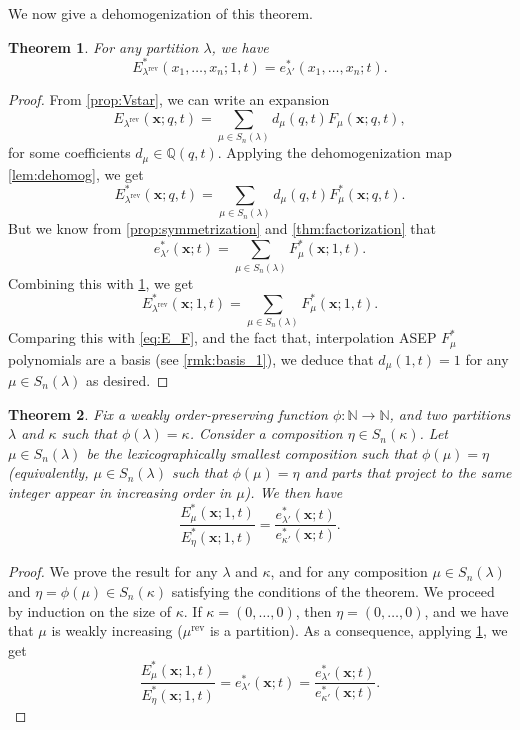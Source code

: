 \documentclass[12pt]{amsart}
\newtheorem{thm}{Theorem}[section]
\theoremstyle{definition}
\newcommand{\bfx}{\boldsymbol{x}}
\DeclareMathOperator{\rev}{rev}
\newcommand{\QQ}{\mathbb Q}
\newcommand{\NN}{\mathbb N}
\begin{document}
\begin{appendices}
We now give  a dehomogenization of this theorem.

\begin{thm}\label{thm:E_partition}
    For any partition $\lambda$, we have
    $$E^*_{\lambda^{\rev}}(x_1,\dots,x_n;1,t)=e^*_{\lambda'}(x_1,\dots,x_n;t).$$
\end{thm}
\begin{proof}
From \cref{prop:Vstar}, we can write an expansion
$$E_{\lambda^{\rev}}(\bfx;q,t)=\sum_{\mu\in S_n(\lambda)}d_{\mu}(q,t)F_\mu(\bfx;q,t),$$
for some coefficients $d_\mu\in \QQ(q,t)$.
Applying the dehomogenization map \cref{lem:dehomog}, we get
\begin{equation}\label{eq:E_F}
  E^*_{\lambda^{\rev}}(\bfx;q,t)=\sum_{\mu\in S_n(\lambda)}d_{\mu}(q,t)F^*_\mu(\bfx;q,t).  
\end{equation}
    But we know from \cref{prop:symmetrization} and \cref{thm:factorization} that
    $$e^*_{\lambda'}(\bfx;t)=\sum_{\mu\in S_n(\lambda)}F^*_\mu(\bfx;1,t).$$
    Combining this with  \cref{thm:E_partition},       we get
    $$E^*_{\lambda^{\rev}}(\bfx;1,t)=\sum_{\mu\in S_n(\lambda)}F^*_\mu(\bfx;1,t).$$
    Comparing this with \cref{eq:E_F}, and the fact that, interpolation ASEP $F_\mu^*$ polynomials are a basis (see \cref{rmk:basis_1}), we deduce that $d_\mu(1,t)=1$ for any $\mu\in S_n(\lambda)$ as desired.
\end{proof}


\begin{thm}\label{thm:recoloring}
Fix a weakly order-preserving function $\phi:\NN\rightarrow\NN$, and two partitions $\lambda$ and $\kappa$ such that $\phi(\lambda)=\kappa$.
Consider a composition  $\eta\in S_n(\kappa)$. Let $\mu \in S_n(\lambda)$ be the lexicographically smallest composition such that $\phi(\mu)=\eta$ (equivalently, $\mu \in S_n(\lambda)$ such that $\phi(\mu)=\eta$ and parts that project to the same integer appear in increasing order in $\mu$).
 We then have
\begin{equation}\label{eq:adjacent}
    \frac{E^*_\mu(\bfx;1,t)}{E^*_{\eta}(\bfx;1,t)}=\frac{e^*_{\lambda'}(\bfx;t)}{e^*_{\kappa'}(\bfx;t)}.
\end{equation}
\end{thm}


\begin{proof}
We prove the result for any $\lambda$ and $\kappa$, and for any composition $\mu \in S_n(\lambda)$ and $\eta=\phi(\mu)\in S_n(\kappa)$ satisfying the conditions of the theorem. We proceed by induction on the size of $\kappa$.  If $\kappa=(0,\dots,0)$, then $\eta=(0,\dots,0)$, and we have that $\mu$ is weakly increasing ($\mu^{\rev}$ is a partition). As a consequence, applying \cref{thm:E_partition}, we get
\begin{equation}
    \frac{E^*_\mu(\bfx;1,t)}{E^*_{\eta}(\bfx;1,t)}=e^*_{\lambda'}(\bfx;t)=\frac{e^*_{\lambda'}(\bfx;t)}{e^*_{\kappa'}(\bfx;t)}.
\end{equation}


\end{proof}
\end{appendices}
\end{document}
